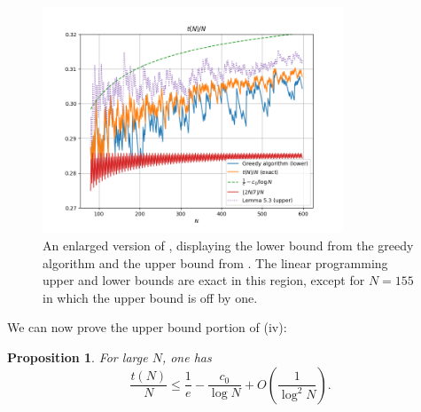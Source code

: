 \documentclass[12pt,a4paper,reqno]{amsart}
\numberwithin{equation}{section}
\theoremstyle{plain}
\newtheorem{proposition}[theorem]{Proposition}
\theoremstyle{definition}
\begin{document}
\begin{figure}
  \centering
  \includegraphics[width=0.8\textwidth]{newplot_600.png}
  \caption{An enlarged version of , displaying the lower bound from the greedy algorithm and the upper bound from .  The linear programming upper and lower bounds are exact in this region, except for $N=155$ in which the upper bound is off by one.}\label{fig-zoom}
\end{figure}


We can now prove the upper bound portion of (iv):

  \begin{proposition}\label{upper-bound}  For large $N$, one has
    $$ \frac{t(N)}{N} \leq \frac{1}{e} - \frac{c_0}{\log N} + O\left( \frac{1}{\log^2 N} \right).$$
    \end{proposition}
    
\end{document}
